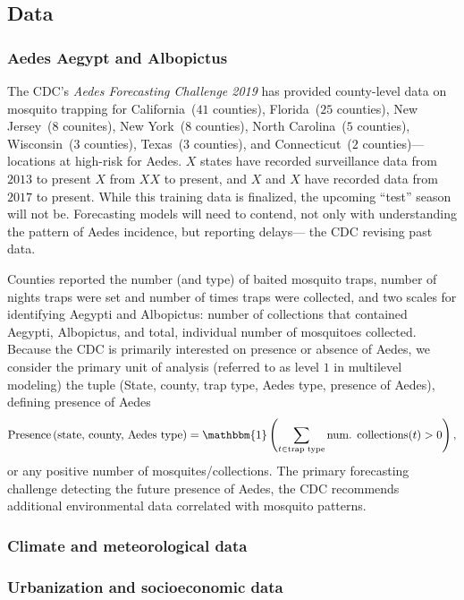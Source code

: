 \documentclass[onecolumn,secnumarabic,amssymb, nobibnotes, aps, pr,superscriptaddress]{revtex4-1}
\def\l{\left}
\def\r{\right}
\begin{document}
\subsection{Data}

\subsubsection{Aedes Aegypt and Albopictus}
The CDC's \textit{Aedes Forecasting Challenge 2019} has provided county-level data on mosquito trapping for California~($41$ counties), Florida~($25$ counties), New Jersey~($8$ counites), New York~($8$ counties), North Carolina~($5$ counties), Wisconsin~($3$ counties), Texas~($3$ counties), and Connecticut~($2$ counties)---locations at high-risk for Aedes.
$X$ states have recorded surveillance data from $2013$ to present $X$ from $XX$ to present, and $X$ and $X$ have recorded data from $2017$ to present.
While this training data is finalized, the upcoming ``test'' season will not be.
Forecasting models will need to contend, not only with understanding the pattern of Aedes incidence, but reporting delays--- the CDC revising past data. 

Counties reported the number (and type) of baited mosquito traps, number of nights traps were set and number of times traps were collected, and two scales for identifying Aegypti and Albopictus: number of collections that contained Aegypti, Albopictus, and total, individual number of mosquitoes collected.
Because the CDC is primarily interested on presence or absence of Aedes, we consider the primary unit of analysis (referred to as level $1$ in multilevel modeling) the tuple (State, county, trap type, Aedes type, presence of Aedes), defining presence of Aedes
\begin{equation}
 \text{Presence}\l( \text{state, county, Aedes type} \r) = \mathbbm{1}\l( \sum_{t \in \text{trap type}} \text{num. collections}(t) > 0 \r),
\end{equation}
or any positive number of mosquites/collections.
The primary forecasting challenge detecting the future presence of Aedes, the CDC recommends additional environmental data correlated with mosquito patterns.   

\subsubsection{Climate and meteorological data}


\subsubsection{Urbanization and socioeconomic data}
\end{document}
